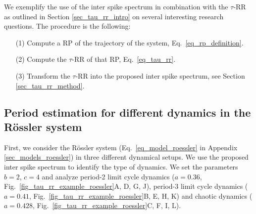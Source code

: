 We exemplify the use of the inter spike spectrum in combination with the $\tau$-RR as outlined in 
Section \ref{sec_tau_rr_intro} on several interesting research questions. The procedure is the following:
\begin{itemize}[noitemsep]
\item[(1)] Compute a RP of the trajectory of the system, Eq.~\eqref{eq_rp_definition}. 
\item[(2)] Compute the $\tau$-RR of that RP, Eq.~\eqref{eq_tau_rr}.
\item[(3)] Transform the $\tau$-RR into the proposed inter spike spectrum, see Section \ref{sec_tau_rr_method}.
\end{itemize}

\subsection{Period estimation for different dynamics in the R\"ossler system}
First, we consider the R\"ossler system (Eq.~\eqref{eq_model_roessler} in Appendix \ref{sec_models_roessler}) 
in three different dynamical setups. We use the proposed inter spike spectrum to
identify the type of dynamics.
We set the parameters $b=2$, $c=4$ and analyze period-2 limit cycle dynamics ($a=0.36$, Fig.~\ref{fig_tau_rr_example_roessler}A, D, G, J), 
period-3 limit cycle dynamics ($a=0.41$, Fig.~\ref{fig_tau_rr_example_roessler}B, E, H, K) and chaotic dynamics ($a=0.428$, Fig.~\ref{fig_tau_rr_example_roessler}C, F, I, L).  


